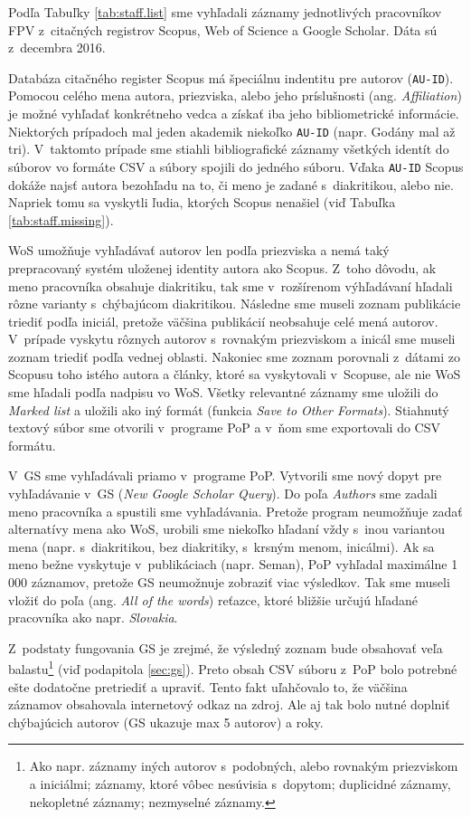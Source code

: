 Podľa Tabuľky \ref{tab:staff.list} sme vyhľadali záznamy jednotlivých
pracovníkov FPV z~citačných registrov Scopus, Web of Science a Google Scholar.
Dáta sú z~decembra 2016.

Databáza citačného register Scopus má špeciálnu indentitu pre autorov
(\texttt{AU-ID}).  Pomocou celého mena autora, priezviska, alebo jeho
príslušnosti (ang.  \emph{Affiliation}) je možné vyhľadať konkrétneho vedca a
získať iba jeho bibliometrické informácie. Niektorých prípadoch mal jeden
akademik niekoľko \texttt{AU-ID} (napr. Godány mal až tri). V~taktomto prípade
sme stiahli bibliografické záznamy všetkých identít do súborov vo formáte CSV a
súbory spojili do jedného súboru.  Vďaka \texttt{AU-ID} Scopus dokáže najsť
autora bezohľadu na to, či meno je zadané s~diakritikou, alebo nie.  Napriek
tomu sa vyskytli ľudia, ktorých Scopus nenašiel (viď Tabuľka
\ref{tab:staff.missing}).

WoS umožňuje vyhľadávať autorov len podľa priezviska a nemá taký prepracovaný
systém uloženej identity autora ako Scopus. Z~toho dôvodu, ak meno pracovníka
obsahuje diakritiku, tak sme v~rozšírenom výhľadávaní hľadali rôzne varianty
s~chýbajúcom diakritikou. Následne sme museli zoznam publikácie triediť podľa
iniciál, pretože väčšina publikácií neobsahuje celé mená autorov. V~prípade
vyskytu rôznych autorov s~rovnakým priezviskom a inicál sme museli zoznam
triediť podľa vednej oblasti. Nakoniec sme zoznam porovnali z~dátami zo Scopusu
toho istého autora a články, ktoré sa vyskytovali v~Scopuse, ale nie WoS sme
hľadali podľa nadpisu vo WoS. Všetky relevantné záznamy sme uložili do
\emph{Marked list} a uložili ako iný formát (funkcia \emph{Save to Other
  Formats}). Stiahnutý textový súbor sme otvorili v~programe PoP a v~ňom sme
exportovali do CSV formátu.

V~GS sme vyhľadávali priamo v~programe PoP. Vytvorili sme nový dopyt pre
vyhľadávanie v~GS (\emph{New Google Scholar Query}). Do poľa \emph{Authors} sme
zadali meno pracovníka a spustili sme vyhľadávania. Pretože program neumožňuje
zadať alternatívy mena ako WoS, urobili sme niekoľko hľadaní vždy s~inou
variantou mena (napr. s~diakritikou, bez diakritiky, s~krsným menom, inicálmi).
Ak sa meno bežne vyskytuje v~publikáciach (napr. Seman), PoP vyhľadal maximálne
1\,000 záznamov, pretože GS neumožnuje zobraziť viac výsledkov. Tak sme museli
vložiť do poľa  (ang. \emph{All of the words}) reťazce, ktoré
bližšie určujú hľadané pracovníka ako napr.  \emph{Slovakia}.

Z~podstaty fungovania GS je zrejmé, že výsledný zoznam bude obsahovať veľa
balastu\footnote{Ako napr. záznamy iných autorov s~podobných, alebo rovnakým
  priezviskom a iniciálmi; záznamy, ktoré vôbec nesúvisia s~dopytom; duplicidné
  záznamy, nekopletné záznamy; nezmyselné záznamy.} (viď podapitola
\ref{sec:gs}).  Preto obsah CSV súboru z~PoP bolo potrebné ešte dodatočne
pretriediť a upraviť. Tento fakt uľahčovalo to, že väčšina záznamov obsahovala
internetový odkaz na zdroj. Ale aj tak bolo nutné doplniť chýbajúcich autorov
(GS ukazuje max 5 autorov) a roky.


